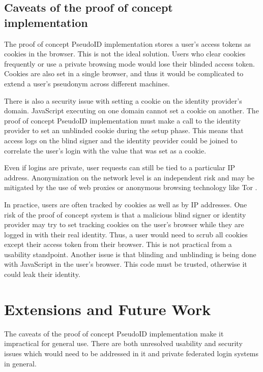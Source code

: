 \documentclass{llncs}
\begin{document}
\subsection{Caveats of the proof of concept implementation}
\label{subsec:caveats}

The proof of concept PseudoID implementation stores a user's access
tokens as cookies in the browser. This is not the ideal solution. Users 
who clear cookies frequently or use a private browsing mode would
lose their blinded access token. Cookies are also set in a
single browser, and thus it would be complicated to extend a user's
pseudonym across different machines.

There is also a security issue with setting a cookie on the identity
provider's domain. JavaScript executing on one domain cannot set a
cookie on another. The proof of concept PseudoID implementation must
make a call to the identity provider to set an unblinded cookie during
the setup phase. This means that access logs on the blind signer and
the identity provider could be joined to correlate the user's login
with the value that was set as a cookie. 

Even if logins are private, user requests can still be tied to a
particular IP address. Anonymization on the network level is an
independent risk and may be mitigated by the use of web proxies or
anonymous browsing technology like Tor \cite{Tor}. 

In practice, users are often tracked by cookies as well as by IP
addresses. One risk of the proof of concept system is that a malicious
blind signer or identity provider may try to set tracking cookies on
the user's browser while they are logged in with their real
identity. Thus, a user would need to scrub all cookies except their
access token from their browser. This is not practical from a
usability standpoint. Another issue is that blinding and unblinding is
being done with JavaScript in the user's browser. This code must be
trusted, otherwise it could leak their identity.

\section{Extensions and Future Work}

The caveats of the proof of concept PseudoID implementation make it
impractical for general use. There are both unresolved usability and
security issues which would need to be addressed in it and private
federated login systems in general.
\end{document}
